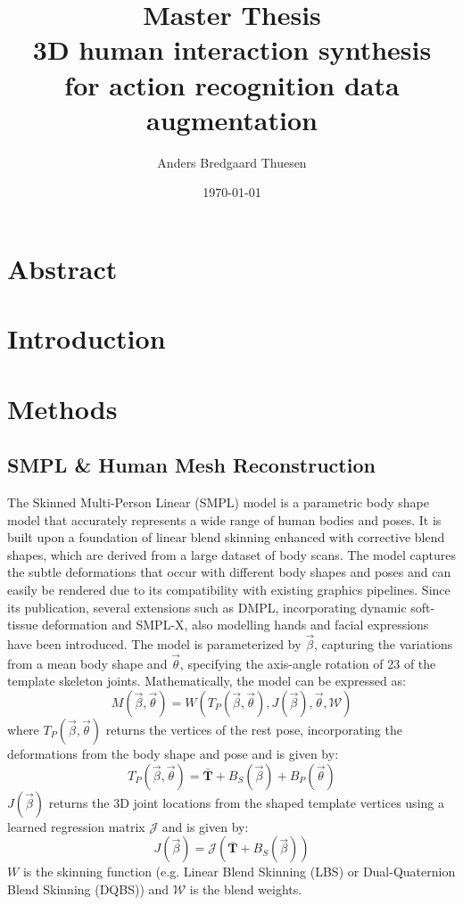 \documentclass[options]{report}
\title{{\large Master Thesis} \\ 3D human interaction synthesis \\ for action recognition data augmentation}
\author{Anders Bredgaard Thuesen}
\date{\today}
\begin{document}
\maketitle

\section*{Abstract}

\section*{Introduction}



\section*{Methods}

\subsection*{SMPL \& Human Mesh Reconstruction }
The Skinned Multi-Person Linear (SMPL) model is a parametric body shape model that accurately represents a wide range of human bodies and poses. It is built upon a foundation of linear blend skinning enhanced with corrective blend shapes, which are derived from a large dataset of body scans. The model captures the subtle deformations that occur with different body shapes and poses and can easily be rendered due to its compatibility with existing graphics pipelines. Since its publication, several extensions such as DMPL, incorporating dynamic soft-tissue deformation and SMPL-X, also modelling hands and facial expressions have been introduced. The model is parameterized by $\vec{\beta}$, capturing the variations from a mean body shape and $\vec{\theta}$, specifying the axis-angle rotation of 23 of the template skeleton joints. Mathematically, the model can be expressed as:
\begin{equation}
    M(\vec{\beta}, \vec{\theta}) = W(T_P(\vec{\beta}, \vec{\theta}), J(\vec{\beta}), \vec{\theta}, \mathcal{W})
\end{equation}
where $T_P(\vec{\beta}, \vec{\theta})$ returns the vertices of the rest pose, incorporating the deformations from the body shape and pose and is given by:
\begin{equation}
    T_P(\vec{\beta}, \vec{\theta}) = \mathbf{\bar{T}} + B_S(\vec{\beta}) + B_P(\vec{\theta})
\end{equation}
$J(\vec{\beta})$ returns the 3D joint locations from the shaped template vertices using a learned regression matrix $\mathcal{J}$ and is given by:
\begin{equation}
    J(\vec{\beta}) = \mathcal{J}(\mathbf{\bar{T}} + B_S(\vec{\beta}))
\end{equation}
$W$ is the skinning function (e.g. Linear Blend Skinning (LBS) or Dual-Quaternion Blend Skinning (DQBS)) and $\mathcal{W}$ is the blend weights. 
\end{document}
